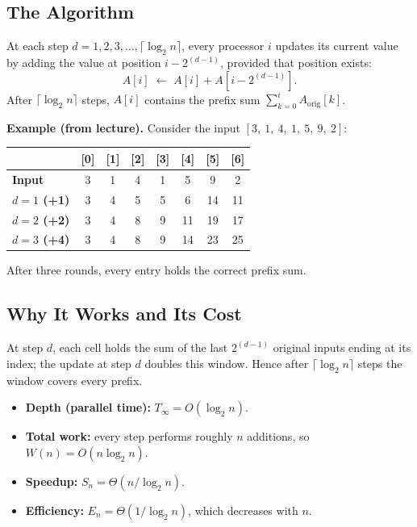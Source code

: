 \subsection{The Algorithm}
At each step $d = 1, 2, 3, \ldots, \lceil \log_2 n \rceil$, every processor
$i$ updates its current value by adding the value at position
$i - 2^{(d-1)}$, provided that position exists:
\[
A[i] \;\leftarrow\; A[i] + A[i - 2^{(d-1)}].
\]
After $\lceil \log_2 n \rceil$ steps, $A[i]$ contains the prefix sum
$\sum_{k=0}^{i} A_{\mathrm{orig}}[k]$.

\begin{ppexample}
\textbf{Example (from lecture).} Consider the input
$[3,\ 1,\ 4,\ 1,\ 5,\ 9,\ 2]$:
\begin{center}
\begin{tabular}{lccccccc}
\toprule
            & [0] & [1] & [2] & [3] & [4] & [5] & [6] \\
\midrule
\textbf{Input} & 3 & 1 & 4 & 1 & 5 & 9 & 2 \\
\textbf{$d=1$ (+1)} & 3 & 4 & 5 & 5 & 6 & 14 & 11 \\
\textbf{$d=2$ (+2)} & 3 & 4 & 8 & 9 & 11 & 19 & 17 \\
\textbf{$d=3$ (+4)} & 3 & 4 & 8 & 9 & 14 & 23 & 25 \\
\bottomrule
\end{tabular}
\end{center}
After three rounds, every entry holds the correct prefix sum.
\end{ppexample}

\subsection{Why It Works and Its Cost}
At step $d$, each cell holds the sum of the last $2^{(d-1)}$ original
inputs ending at its index; the update at step $d$ doubles this window.
Hence after $\lceil \log_2 n \rceil$ steps the window covers every prefix.

\begin{itemize}[leftmargin=*]
  \item \textbf{Depth (parallel time):} $T_\infty = O(\log_2 n)$.
  \item \textbf{Total work:} every step performs roughly $n$ additions,
        so $W(n) = O(n \log_2 n)$.
  \item \textbf{Speedup:} $S_n = \Theta(n / \log_2 n)$.
  \item \textbf{Efficiency:} $E_n = \Theta(1/\log_2 n)$, which decreases
        with $n$.
\end{itemize}

